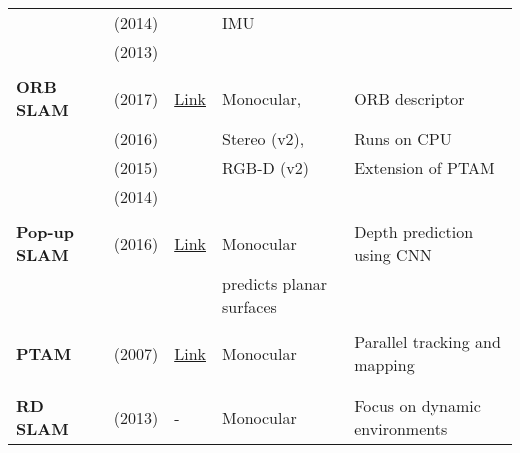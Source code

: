 {\begin{longtable}{l|l|l|l|l}
			& \cite{Leutenegger2014} (2014)     &                                                                    & IMU                   &\\
			& \cite{Leutenegger2013} (2013)     &                                                                    &                       &\\
			&                                   &                                                                    &                       &\\
			\textbf{ORB SLAM}      & \cite{Mur-Artal2017} (2017)       & \href{https://github.com/raulmur/ORB_SLAM2}{Link}                  &  Monocular,           & ORB descriptor\\
			& \cite{Mur-Artal} (2016)      &                                                                    &  Stereo (v2),         & Runs on CPU\\
			& \cite{orbslam} (2015)       &                                                                    &  RGB-D (v2)           & Extension of PTAM\\
			& \cite{Mur-Artal2014} (2014)       &                                                                    &                       &\\
			&                                   &                                                                    &                       &\\
			\textbf{Pop-up SLAM}   & \cite{Yang2016} (2016)            & {\href{https://github.com/shichaoy/pop_up_image}{Link}}            & Monocular             & Depth prediction using CNN \\
			&         &          &  predicts planar surfaces\\
			&                                   &                                                                    &                       &\\
			\textbf{PTAM}          & \cite{4538852} (2007)           & {\href{https://github.com/Oxford-PTAM/PTAM-GPL}{Link}}             & Monocular             & Parallel tracking and mapping\\
			&                                   &                                                                    &                       &\\
			&                                   &                                                                    &                       &\\
			\textbf{RD SLAM}       & \cite{Tan2013a} (2013)            & -                                                                  & Monocular             & Focus on dynamic environments\\

\end{longtable}}
